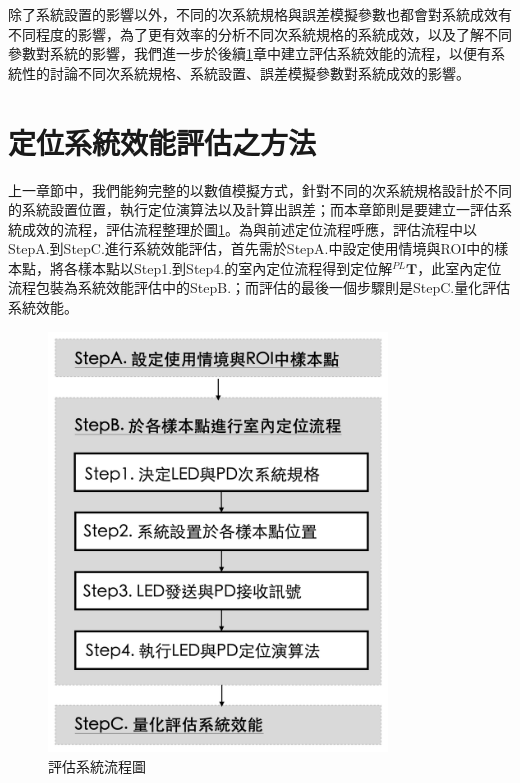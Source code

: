 除了系統設置的影響以外，不同的次系統規格與誤差模擬參數也都會對系統成效有不同程度的影響，為了更有效率的分析不同次系統規格的系統成效，以及了解不同參數對系統的影響，我們進一步於後續\ref{chp:system_evaluate}章中建立評估系統效能的流程，以便有系統性的討論不同次系統規格、系統設置、誤差模擬參數對系統成效的影響。













\newpage

\section{定位系統效能評估之方法}
\label{chp:system_evaluate}

上一章節中，我們能夠完整的以數值模擬方式，針對不同的次系統規格設計於不同的系統設置位置，執行定位演算法以及計算出誤差；而本章節則是要建立一評估系統成效的流程，評估流程整理於圖\ref{pic:evaluate_flow}。為與前述定位流程呼應，評估流程中以StepA.到StepC.進行系統效能評估，首先需於StepA.中設定使用情境與ROI中的樣本點，將各樣本點以Step1.到Step4.的室內定位流程得到定位解$^{PL}\boldsymbol{T}$，此室內定位流程包裝為系統效能評估中的StepB.；而評估的最後一個步驟則是StepC.量化評估系統效能。


\begin{figure}[htpb]
    \centering
    \includegraphics[width=9cm]{ch4pic/evaluate_flow.png}
    \caption{評估系統流程圖}
    \label{pic:evaluate_flow}
\end{figure}


